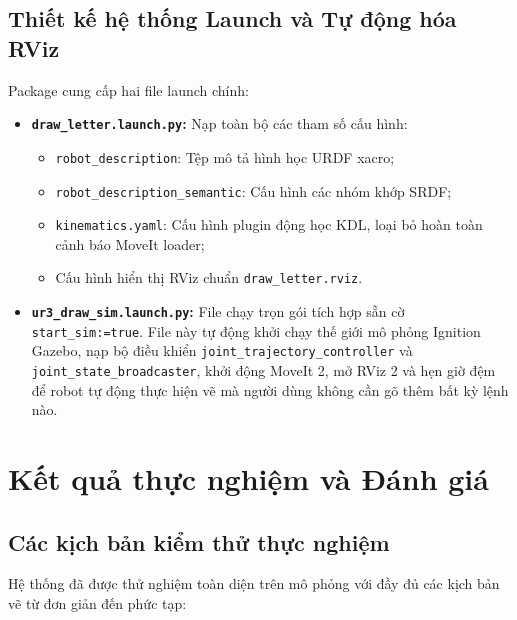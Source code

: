 \documentclass[a4paper,12pt]{article}
\begin{document}
\subsection{Thiết kế hệ thống Launch và Tự động hóa RViz}
Package cung cấp hai file launch chính:
\begin{itemize}
    \item \textbf{\texttt{draw\_letter.launch.py}:} Nạp toàn bộ các tham số cấu hình:
    \begin{itemize}[noitemsep]
        \item \texttt{robot\_description}: Tệp mô tả hình học URDF xacro;
        \item \texttt{robot\_description\_semantic}: Cấu hình các nhóm khớp SRDF;
        \item \texttt{kinematics.yaml}: Cấu hình plugin động học KDL, loại bỏ hoàn toàn cảnh báo MoveIt loader;
        \item Cấu hình hiển thị RViz chuẩn \texttt{draw\_letter.rviz}.
    \end{itemize}
    \item \textbf{\texttt{ur3\_draw\_sim.launch.py}:} File chạy trọn gói tích hợp sẵn cờ \texttt{start\_sim:=true}. File này tự động khởi chạy thế giới mô phỏng Ignition Gazebo, nạp bộ điều khiển \texttt{joint\_trajectory\_controller} và \texttt{joint\_state\_broadcaster}, khởi động MoveIt 2, mở RViz 2 và hẹn giờ đệm để robot tự động thực hiện vẽ mà người dùng không cần gõ thêm bất kỳ lệnh nào.
\end{itemize}

\section{Kết quả thực nghiệm và Đánh giá}

\subsection{Các kịch bản kiểm thử thực nghiệm}
Hệ thống đã được thử nghiệm toàn diện trên mô phỏng với đầy đủ các kịch bản vẽ từ đơn giản đến phức tạp:
\end{document}
